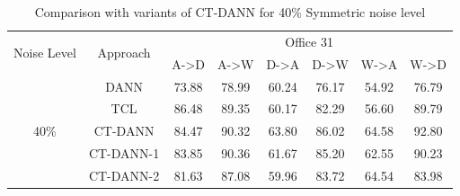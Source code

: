 \vspace{-1.4cm}
\begin{center}
\begin{table}[h!]
    \centering
    \begin{tabular}{|c|c|c|c|c|c|c|c|}
    \hline
    \multirow{2}{3em}{Noise Level} & \multirow{2}{4em}{Approach} &  \multicolumn{6}{|c|}{Office 31}\\
    \cline{3-8}
    & & A->D & A->W & D->A & D->W & W->A & W->D\\
    \hline
    
    \multirow{5}{3em}{40\%} & DANN & 73.88 & 78.99 & 60.24 & 76.17 & 54.92 & 76.79 \\
    & TCL & 86.48 & 89.35 & 60.17 & 82.29 & 56.60 & 89.79\\
    & CT-DANN & 84.47 & 90.32 & 63.80 & 86.02 & 64.58 & 92.80\\
    & CT-DANN-1 & 83.85 & 90.36 & 61.67 & 85.20 & 62.55 & 90.23 \\
    & CT-DANN-2 & 81.63 & 87.08 & 59.96 & 83.72 & 64.54 & 83.98 \\
    \hline
    \end{tabular}
    \caption{Comparison with variants of CT-DANN for 40\% Symmetric noise level}
    \label{tab:office_var}
    \end{table}
\end{center}
\vspace{-1cm}

\begin{center}
\begin{table}[h!]
    \centering
    \caption{Classification Accuracy (\%) on \textbf{Office-Home} with 40\% Symmetric noise levels}
    \end{table}
\end{center}

